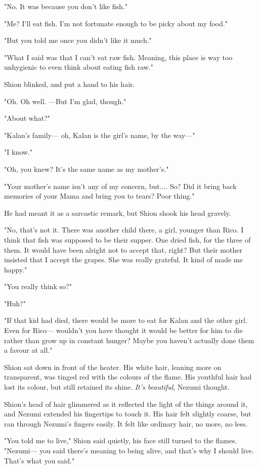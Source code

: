"No. It was because you don't like fish."

"Me? I'll eat fish. I'm not fortunate enough to be picky about my food."

"But you told me once you didn't like it much."

"What I said was that I can't eat raw fish. Meaning, this place is way
too unhygienic to even think about eating fish raw."

Shion blinked, and put a hand to his hair.

"Oh. Oh well. ---But I'm glad, though."

"About what?"

"Kalan's family--- oh, Kalan is the girl's name, by the way---"

"I know."

"Oh, you knew? It's the same name as my mother's."

"Your mother's name isn't any of my concern, but.... So? Did it bring
back memories of your Mama and bring you to tears? Poor thing."

He had meant it as a sarcastic remark, but Shion shook his head gravely.

"No, that's not it. There was another child there, a girl, younger than
Rico. I think that fish was supposed to be their supper. One dried fish,
for the three of them. It would have been alright not to accept that,
right? But their mother insisted that I accept the grapes. She was
really grateful. It kind of made me happy."

"You really think so?"

"Huh?"

"If that kid had died, there would be more to eat for Kalan and the
other girl. Even for Rico--- wouldn't you have thought it would be better
for him to die rather than grow up in constant hunger? Maybe you haven't
actually done them a favour at all."

Shion sat down in front of the heater. His white hair, leaning more on
transparent, was tinged red with the colours of the flame. His youthful
hair had lost its colour, but still retained its shine. \emph{It's beautiful},
Nezumi thought.

Shion's head of hair glimmered as it reflected the light of the things
around it, and Nezumi extended his fingertips to touch it. His hair felt
slightly coarse, but ran through Nezumi's fingers easily. It felt like
ordinary hair, no more, no less.

"You told me to live," Shion said quietly, his face still turned to the
flames. "Nezumi--- you said there's meaning to being alive, and that's why
I should live. That's what you said."

